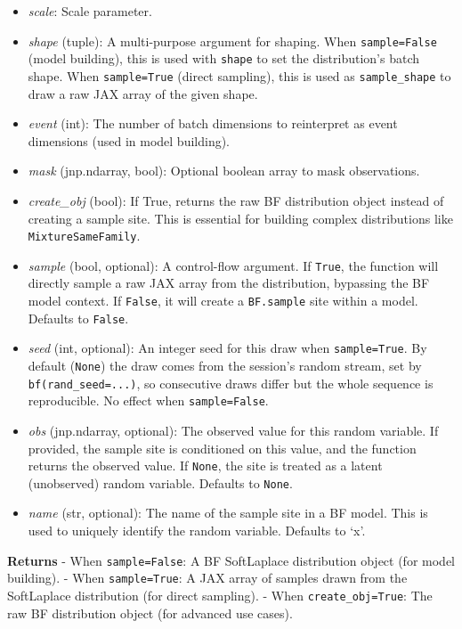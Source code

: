 \documentclass[
  letterpaper,
  DIV=11,
  numbers=noendperiod]{scrartcl}
\begin{document}
\begin{itemize}
\item
  \emph{scale}: Scale parameter.
\item
  \emph{shape} (tuple): A multi-purpose argument for shaping. When
  \texttt{sample=False} (model building), this is used with
  \texttt{shape} to set the distribution's batch shape. When
  \texttt{sample=True} (direct sampling), this is used as
  \texttt{sample\_shape} to draw a raw JAX array of the given shape.
\item
  \emph{event} (int): The number of batch dimensions to reinterpret as
  event dimensions (used in model building).
\item
  \emph{mask} (jnp.ndarray, bool): Optional boolean array to mask
  observations.
\item
  \emph{create\_obj} (bool): If True, returns the raw BF distribution
  object instead of creating a sample site. This is essential for
  building complex distributions like \texttt{MixtureSameFamily}.
\item
  \emph{sample} (bool, optional): A control-flow argument. If
  \texttt{True}, the function will directly sample a raw JAX array from
  the distribution, bypassing the BF model context. If \texttt{False},
  it will create a \texttt{BF.sample} site within a model. Defaults to
  \texttt{False}.
\item
  \emph{seed} (int, optional): An integer seed for this draw when
  \texttt{sample=True}. By default (\texttt{None}) the draw comes from
  the session's random stream, set by \texttt{bf(rand\_seed=...)}, so
  consecutive draws differ but the whole sequence is reproducible. No
  effect when \texttt{sample=False}.
\item
  \emph{obs} (jnp.ndarray, optional): The observed value for this random
  variable. If provided, the sample site is conditioned on this value,
  and the function returns the observed value. If \texttt{None}, the
  site is treated as a latent (unobserved) random variable. Defaults to
  \texttt{None}.
\item
  \emph{name} (str, optional): The name of the sample site in a BF
  model. This is used to uniquely identify the random variable. Defaults
  to `x'.
\end{itemize}

\textbf{Returns} - When \texttt{sample=False}: A BF SoftLaplace
distribution object (for model building). - When \texttt{sample=True}: A
JAX array of samples drawn from the SoftLaplace distribution (for direct
sampling). - When \texttt{create\_obj=True}: The raw BF distribution
object (for advanced use cases).
\end{document}
